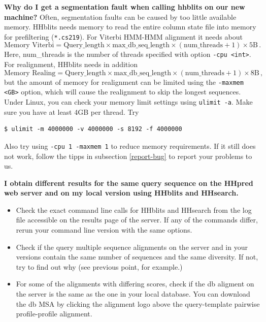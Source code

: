 \documentclass[11pt,a4paper]{article}
\begin{document}
{\bf Why do I get a segmentation fault when calling hhblits on our new machine?}
Often, segmentation faults can be caused by too little available memory. HHblits needs memory to read the entire column state file into memory for prefiltering (\verb`*.cs219`). For Viterbi HMM-HMM alignment it needs about 
\begin{equation}
\textrm{Memory Viterbi} = \textrm{Query\_length} \times \textrm{max\_db\_seq\_length} \times (\textrm{num\_threads}+1) \times 5 \textrm{B} \,. 
\end{equation}
Here, num\_threads is the number of threads specified with option \verb`-cpu <int>`. For realignment, HHblits needs in addition 
\begin{equation}
\textrm{Memory Realing} = \textrm{Query\_length} \times \textrm{max\_db\_seq\_length} \times (\textrm{num\_threads}+1) \times 8 \textrm{B} \,, 
\end{equation}
but the amount of memory for realignment can be limited using the \verb`-maxmem <GB>` option, which will cause the realignment to skip the longest sequences. Under Linux, you can check your memory limit settings using \verb`ulimit -a`. Make sure you have at least 4GB per thread. Try 
\begin{verbatim}
$ ulimit -m 4000000 -v 4000000 -s 8192 -f 4000000
\end{verbatim}
Also try using \verb`-cpu 1 -maxmem 1` to reduce memory requirements. If it still does not work, follow the tipps in subsection \ref{report-bug} to report your problems to us.

{\bf I obtain different results for the same query sequence on the HHpred web server and on my local version using HHblits and HHsearch.}
\begin{itemize}
\item Check the exact command line calls for HHblits and HHsearch from the log file accessible on the results page of the server. If any of the commands differ, rerun your command line version with the same options. 
\item Check if the query multiple sequence alignments on the server and in your versions contain the same number of sequences and the same diversity. If not, try to find out why (see previous point, for example.)
\item For some of the alignments with differing scores, check if the db aligment on the server is the same as the one in your local database. You can download the db MSA by clicking the alignment logo above the query-template pairwise profile-profile alignment.
\end{itemize}
\end{document}
